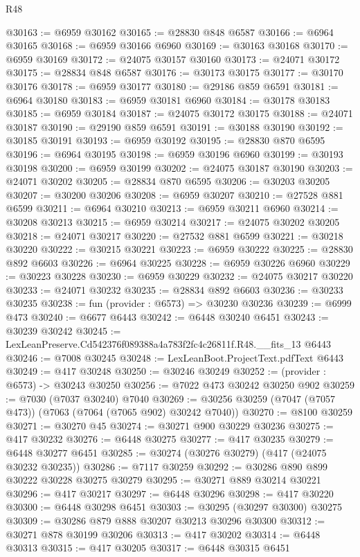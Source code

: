 \begin{lexlean}{R48}
\begin{coremodule}
@30163 := @6959 @30162
@30165 := @28830 @848 @6587
@30166 := @6964 @30165
@30168 := @6959 @30166 @6960
@30169 := @30163 @30168
@30170 := @6959 @30169
@30172 := @24075 @30157 @30160
@30173 := @24071 @30172
@30175 := @28834 @848 @6587
@30176 := @30173 @30175
@30177 := @30170 @30176
@30178 := @6959 @30177
@30180 := @29186 @859 @6591
@30181 := @6964 @30180
@30183 := @6959 @30181 @6960
@30184 := @30178 @30183
@30185 := @6959 @30184
@30187 := @24075 @30172 @30175
@30188 := @24071 @30187
@30190 := @29190 @859 @6591
@30191 := @30188 @30190
@30192 := @30185 @30191
@30193 := @6959 @30192
@30195 := @28830 @870 @6595
@30196 := @6964 @30195
@30198 := @6959 @30196 @6960
@30199 := @30193 @30198
@30200 := @6959 @30199
@30202 := @24075 @30187 @30190
@30203 := @24071 @30202
@30205 := @28834 @870 @6595
@30206 := @30203 @30205
@30207 := @30200 @30206
@30208 := @6959 @30207
@30210 := @27528 @881 @6599
@30211 := @6964 @30210
@30213 := @6959 @30211 @6960
@30214 := @30208 @30213
@30215 := @6959 @30214
@30217 := @24075 @30202 @30205
@30218 := @24071 @30217
@30220 := @27532 @881 @6599
@30221 := @30218 @30220
@30222 := @30215 @30221
@30223 := @6959 @30222
@30225 := @28830 @892 @6603
@30226 := @6964 @30225
@30228 := @6959 @30226 @6960
@30229 := @30223 @30228
@30230 := @6959 @30229
@30232 := @24075 @30217 @30220
@30233 := @24071 @30232
@30235 := @28834 @892 @6603
@30236 := @30233 @30235
@30238 := fun (provider : @6573) => @30230 @30236
@30239 := @6999 @473
@30240 := @6677 @6443
@30242 := @6448 @30240 @6451
@30243 := @30239 @30242
@30245 := LexLeanPreserve.Cd542376f089388a4a783f2fc4c26811f.R48.__fits_13 @6443
@30246 := @7008 @30245
@30248 := LexLeanBoot.ProjectText.pdfText @6443
@30249 := @417 @30248
@30250 := @30246 @30249
@30252 := (provider : @6573) -> @30243 @30250
@30256 := @7022 @473 @30242 @30250 @902
@30259 := @7030 (@7037 @30240) @7040
@30269 := @30256 @30259 (@7047 (@7057 @473)) (@7063 (@7064 (@7065 @902) @30242 @7040))
@30270 := @8100 @30259
@30271 := @30270 @45
@30274 := @30271 @900 @30229 @30236
@30275 := @417 @30232
@30276 := @6448 @30275
@30277 := @417 @30235
@30279 := @6448 @30277 @6451
@30285 := @30274 (@30276 @30279) (@417 (@24075 @30232 @30235))
@30286 := @7117 @30259
@30292 := @30286 @890 @899 @30222 @30228 @30275 @30279
@30295 := @30271 @889 @30214 @30221
@30296 := @417 @30217
@30297 := @6448 @30296
@30298 := @417 @30220
@30300 := @6448 @30298 @6451
@30303 := @30295 (@30297 @30300) @30275
@30309 := @30286 @879 @888 @30207 @30213 @30296 @30300
@30312 := @30271 @878 @30199 @30206
@30313 := @417 @30202
@30314 := @6448 @30313
@30315 := @417 @30205
@30317 := @6448 @30315 @6451

\end{coremodule}
\end{lexlean}
